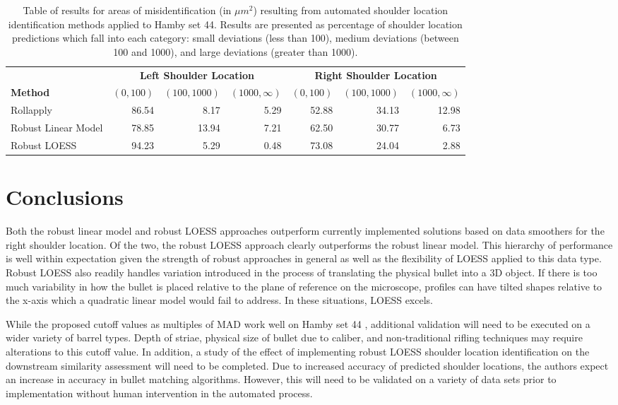 \documentclass[12pt]{article}
\begin{document}
\begin{table}[]
\centering
\begin{tabular}{lrrr|rrr}
& \multicolumn{3}{c}{\textbf{Left Shoulder Location}} & \multicolumn{3}{c}{\textbf{Right Shoulder Location}} \\
\textbf{Method} & $(0,100)$ & $ (100, 1000) $ & $(1000, \infty)$ & $(0,100)$ & $ (100, 1000) $ & $(1000, \infty)$ \\ \hline
Rollapply & 86.54 & 8.17 & 5.29 & 52.88& 34.13&12.98  \\ \hline
Robust Linear Model & 78.85 & 13.94 & 7.21 & 62.50 & 30.77&6.73 \\ \hline
Robust LOESS & 94.23 & 5.29 & 0.48 & 73.08& 24.04&2.88\\ \hline
\end{tabular}
\caption{Table of results for areas of misidentification (in $\mu m^2$) resulting from automated shoulder location identification methods applied to Hamby set 44. Results are presented as percentage of shoulder location predictions which fall into each category: small deviations (less than 100), medium deviations (between 100 and 1000), and large deviations (greater than 1000).}
\label{results-table}
\end{table}

\section{Conclusions}

Both the robust linear model and robust LOESS approaches outperform
currently implemented solutions based on data smoothers for the right
shoulder location. Of the two, the robust LOESS approach clearly
outperforms the robust linear model. This hierarchy of performance is
well within expectation given the strength of robust approaches in
general as well as the flexibility of LOESS applied to this data type.
Robust LOESS also readily handles variation introduced in the process of
translating the physical bullet into a 3D object. If there is too much
variability in how the bullet is placed relative to the plane of
reference on the microscope, profiles can have tilted shapes relative to
the x-axis which a quadratic linear model would fail to address. In
these situations, LOESS excels.

While the proposed cutoff values as multiples of MAD work well on Hamby
set 44 {\color{teal}{and Houston-test}}, additional validation will need
to be executed on a wider variety of barrel types. Depth of striae,
physical size of bullet due to caliber, and non-traditional rifling
techniques may require alterations to this cutoff value.
{\color{teal}{LEAs with shoulders which are not aligned horizontally due to tild may also require slight alterations to the method.}}
In addition, a study of the effect of implementing robust LOESS shoulder
location identification on the downstream similarity assessment will
need to be completed. Due to increased accuracy of predicted shoulder
locations, the authors expect an increase in accuracy in bullet matching
algorithms. However, this will need to be validated on a variety of data
sets prior to implementation without human intervention in the automated
process.



\end{document}
